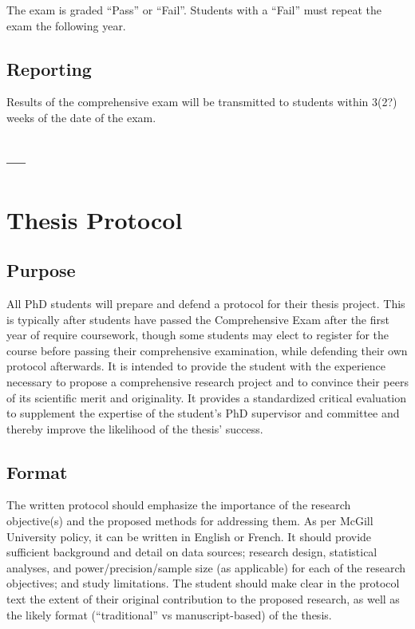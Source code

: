 \documentclass[
]{book}
\begin{document}
The exam is graded ``Pass'' or ``Fail''. Students with a ``Fail'' must repeat the exam the following year.

\hypertarget{reporting}{%
\section{Reporting}\label{reporting}}

Results of the comprehensive exam will be transmitted to students within 3(2?) weeks of the date of the exam.

\hypertarget{section-4}{%
\section{---}\label{section-4}}

\hypertarget{thesis-protocol}{%
\chapter{Thesis Protocol}\label{thesis-protocol}}

\hypertarget{purpose}{%
\section{Purpose}\label{purpose}}

All PhD students will prepare and defend a protocol for their thesis project. This is typically after students have passed the Comprehensive Exam after the first year of require coursework, though some students may elect to register for the course before passing their comprehensive examination, while defending their own protocol afterwards. It is intended to provide the student with the experience necessary to propose a comprehensive research project and to convince their peers of its scientific merit and originality. It provides a standardized critical evaluation
to supplement the expertise of the student's PhD supervisor and committee and thereby improve the likelihood of the thesis' success.

\hypertarget{format}{%
\section{Format}\label{format}}

The written protocol should emphasize the importance of the research objective(s) and the proposed methods for addressing them. As per McGill University policy, it can be written in English or French. It should provide sufficient background and detail on data sources; research design, statistical analyses, and power/precision/sample size (as applicable) for each of the research objectives; and study limitations. The student should make clear in the protocol text the extent of their original contribution to the proposed research, as well as the likely format (``traditional'' vs manuscript-based) of the thesis.
\end{document}
